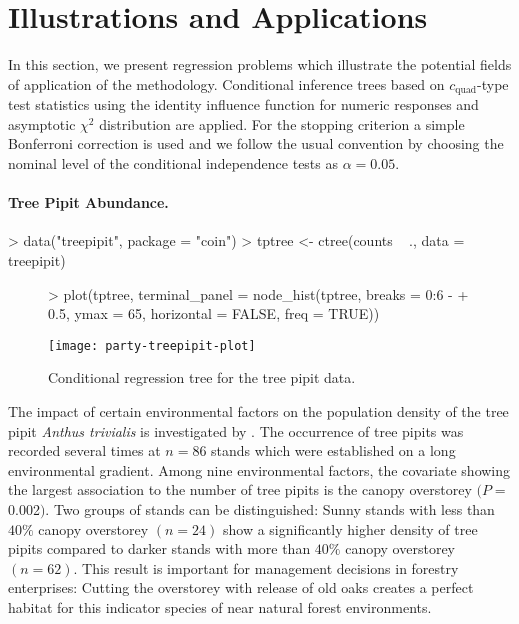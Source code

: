 \documentclass[letter]{article}
\begin{document}
\section{Illustrations and Applications \label{illustrations}}

In this section, we present regression problems which illustrate the
potential fields of application of the methodology.  
Conditional inference trees based on $c_\text{quad}$-type test statistics 
using the identity influence function for numeric responses 
and asymptotic $\chi^2$ distribution are applied.
For the stopping criterion a simple
Bonferroni correction is used and we follow the usual convention by choosing
the nominal level of the conditional independence tests as $\alpha = 0.05$.

\paragraph{Tree Pipit Abundance.}

\begin{Schunk}
\begin{Sinput}
> data("treepipit", package = "coin")
> tptree <- ctree(counts ~ ., data = treepipit)
\end{Sinput}
\end{Schunk}

\begin{figure}[t]
\begin{center}
\begin{Schunk}
\begin{Sinput}
> plot(tptree, terminal_panel = node_hist(tptree, breaks = 0:6 - 
+     0.5, ymax = 65, horizontal = FALSE, freq = TRUE))
\end{Sinput}
\end{Schunk}
\texttt{[image: party-treepipit-plot]}
\caption{Conditional regression tree for the tree pipit data.}
\end{center}
\end{figure}


The impact of certain environmental factors on the population density of the 
tree pipit \textit{Anthus trivialis} 
is investigated by \cite{MuellerHothorn2004}.
The occurrence of tree pipits was recorded several times at
$n = 86$ stands which were established on a long environmental gradient. 
Among nine environmental factors, 
the covariate showing the largest association to the number of tree pipits
is the canopy overstorey $(P = $0.002$)$. 
Two groups of stands can be distinguished: Sunny stands with less than $40\%$
canopy overstorey $(n = 24)$ show a
significantly higher density of tree pipits compared to darker stands with more than
$40\%$ canopy overstorey $(n = 62)$.
This result is important for management decisions
in forestry enterprises: Cutting the overstorey with release of old
oaks creates a perfect habitat for this indicator species
of near natural forest environments. 
\end{document}
